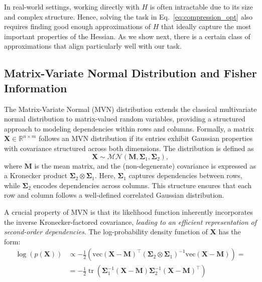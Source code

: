 \documentclass{article}
\begin{document}
In real-world settings, working directly with $H$ is often intractable due to its size and complex structure. Hence, solving the task in Eq.~\ref{eq:compression_opt} also requires finding good enough approximations of $H$ that ideally capture the most important properties of the Hessian. As we show next, there is a certain class of approximations that align particularly well with our task. 


\subsection{Matrix-Variate Normal Distribution and Fisher Information}
\label{sec:mvn_theory}
The Matrix-Variate Normal (MVN) distribution \cite{gupta2018matrix} extends the classical multivariate normal distribution to matrix-valued random variables, providing a structured approach to modeling dependencies within rows and columns. Formally, a matrix $\mathbf{X}\in\mathbb{R}^{n \times m}$ follows an MVN distribution if its entries exhibit Gaussian properties with covariance structured across both dimensions. The distribution is defined as
\begin{equation}
    \mathbf{X} \sim \mathcal{MN}(\mathbf{M}, \mathbf{\Sigma}_1, \mathbf{\Sigma}_2),
\end{equation}
where $\mathbf{M}$ is the mean matrix, and the (non-degenerate) covariance is expressed as a Kronecker product $\mathbf{\Sigma}_2\otimes \mathbf{\Sigma}_1$. Here, $\mathbf{\Sigma}_1$ captures dependencies between rows, while $\mathbf{\Sigma}_2$ encodes dependencies across columns. This structure ensures that each row and column follows a well-defined correlated Gaussian distribution.

A crucial property of MVN is that its likelihood function inherently incorporates the inverse Kronecker-factored covariance, \emph{leading to an efficient representation of second-order dependencies}. 
The log-probability density function of $\mathbf{X}$ has the form:
\begin{align}
\label{eq:mv}
\log(p(\mathbf{X})) & \propto 
-\frac{1}{2}\left(  
\mathrm{vec}\left(\mathbf{X} - \mathbf{M}\right)^\top (\mathbf{\Sigma}_2 \otimes \mathbf{\Sigma}_1)^{-1} \mathrm{vec}\left(\mathbf{X} - \mathbf{M}\right) 
\right) \nonumber=\\
&=
-\frac{1}{2} \operatorname{tr}\left(  
\mathbf{\Sigma}_1^{-1}\left(\mathbf{X} - \mathbf{M}\right) \mathbf{\Sigma}_2^{-1} \left(\mathbf{X} - \mathbf{M}\right)^\top 
\right)
\end{align}
\end{document}
